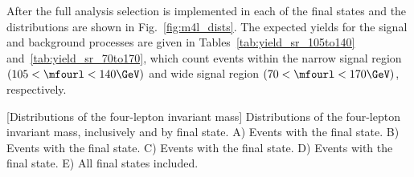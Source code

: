 After the full analysis selection is implemented in each of the \fourl final states and the distributions are shown in Fig.~\ref{fig:m4l_dists}.
The expected yields for the signal and background processes are given in Tables~\ref{tab:yield_sr_105to140} and~\ref{tab:yield_sr_70to170},
which count events within the narrow signal region $\left(105 < \mfourl < 140\GeV\right)$ and wide signal region $\left(70 < \mfourl < 170\GeV\right)$, respectively.
\begin{multiFigure}
    \centering
        [Distributions of the four-lepton invariant mass]
        {Distributions of the four-lepton invariant mass, inclusively and by final state.
        \;A) Events with the \fourmu final state.
        \;B) Events with the \foure final state.
        \;C) Events with the \twoetwomu final state.
        \;D) Events with the \twomutwoe final state.
        \;E) All final states included.
        }
    \label{fig:m4l_dists}
\end{multiFigure}
